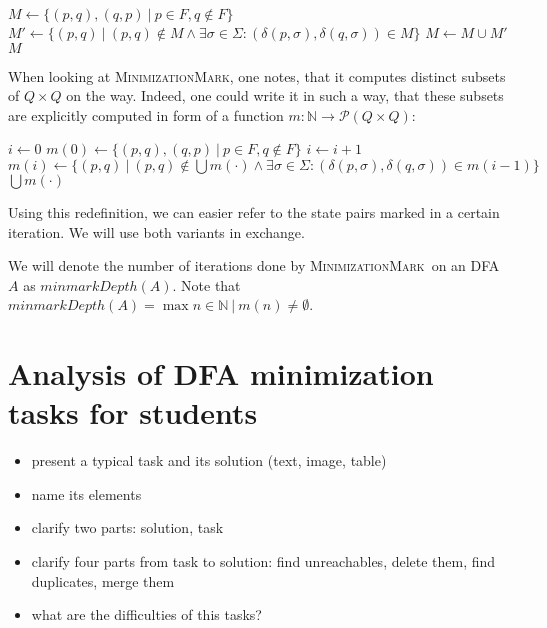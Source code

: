 \documentclass[a4paper, oneside, 11pt]{report}
\theoremstyle{definition}
\theoremstyle{remark}
\newcommand{\MinMark}{\textsc{MinimizationMark}}
\begin{document}
\begin{algorithmic}[1]
	\State $M \gets \{ (p,q), (q,p)\ |\ p \in F, q \notin F \}$
	\Do
		\State $M' \gets \{ (p,q)\ |\ (p,q) \notin M \land \exists \sigma \in \Sigma \colon (\delta(p,\sigma), \delta(q,\sigma)) \in M \}$
		\State $M \gets M \cup M'$
	\State \Return $M$
	\EndFunction
\end{algorithmic}
\vspace{0.2cm}
When looking at \MinMark, one notes, that it computes distinct subsets of $Q \times Q$ on the way. Indeed, one could write it in such a way, that these subsets are explicitly computed in form of a function $m\colon\mathbb{N}\to\mathcal{P}(Q\times Q)$:
\vspace{0.2cm}
\begin{algorithmic}[1]
	\State $i \gets 0$
	\State $m(0) \gets \{ (p,q), (q,p)\ |\ p \in F, q \notin F \}$
	\Do
		\State $i \gets i + 1$
		\State $m(i) \gets \{ (p,q)\ |\ (p,q) \notin \bigcup{m(\cdot)} \land \exists \sigma \in \Sigma \colon (\delta(p,\sigma), \delta(q,\sigma)) \in m(i-1) \}$
	\State \Return $\bigcup{m(\cdot)}$
	\EndFunction
\end{algorithmic}
\vspace{0.2cm}
Using this redefinition, we can easier refer to the state pairs marked in a certain iteration. We will use both variants in exchange.

We will denote the number of iterations done by \MinMark\ on an DFA $A$ as $minmarkDepth(A)$. Note that $minmarkDepth(A) = \max n \in \mathbb{N}\ |\ m(n) \neq \emptyset$.



\section{Analysis of DFA minimization tasks for students}

\begin{itemize}
	\item present a typical task and its solution (text, image, table)
	\item name its elements
	\item clarify two parts: solution, task
	\item clarify four parts from task to solution: find unreachables, delete them, find duplicates, merge them
	\item what are the difficulties of this tasks?
\end{itemize}
\end{document}
